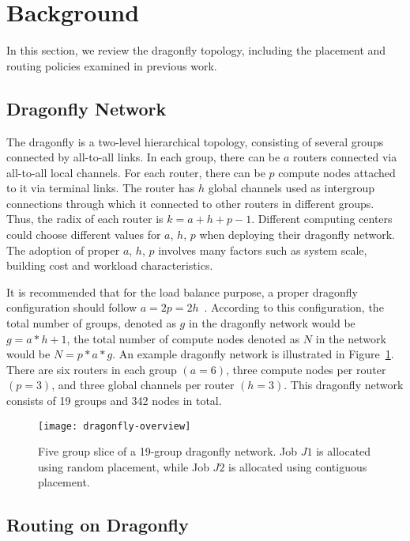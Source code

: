 
\section{Background}
\label{sec:background}

In this section, we review the dragonfly topology, including the placement and routing policies examined in previous work. 

\subsection{Dragonfly Network}
\label{sec:network}
The dragonfly is a two-level hierarchical topology, consisting of several groups connected by all-to-all links. In each group, there can be $a$ routers connected via all-to-all local channels. For each router, there can be $p$ compute nodes attached to it via terminal links. The router has $h$ global channels used as intergroup connections through which it connected to other routers in different groups. Thus, the radix of each router is $k = a+h+p-1$. Different computing centers could choose different values for  $a$, $h$, $p$ when deploying their dragonfly network. The adoption of proper $a$, $h$, $p$ involves many factors such as system scale, building cost and workload characteristics. 

It is recommended that for the load balance purpose, a proper dragonfly configuration should follow $a=2p=2h$~\cite{kim-micro}. According to this configuration, the total number of groups, denoted as $g$ in the dragonfly network would be $g = a*h+1 $, the total number of compute nodes denoted as $N$ in the network would be $N = p*a*g $. An example dragonfly network is illustrated in Figure~\ref{fig:dragonfly-overview}. There are six routers in each group $(a=6)$, three compute nodes per router $(p=3)$, and three global channels per router $(h=3)$. This dragonfly network consists of 19 groups and 342 nodes in total.

\begin{figure}[h!] 
  \centering
  \texttt{[image: dragonfly-overview]}
  \caption{Five group slice of a 19-group dragonfly network. Job $J1$ is allocated using random placement, while Job $J2$ is allocated using contiguous placement.}
  \label{fig:dragonfly-overview}
\end{figure}


\subsection{Routing on Dragonfly}
\label{sec:routing-schemes}

